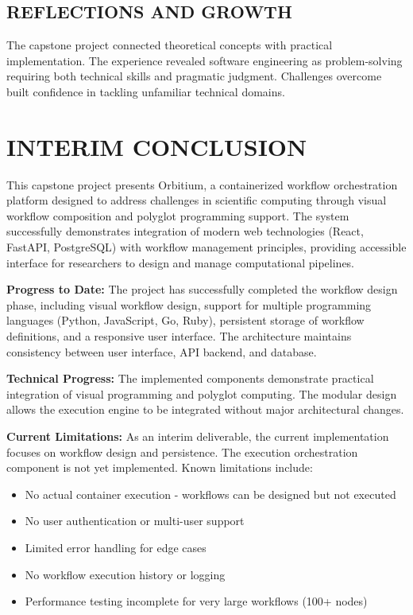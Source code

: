 \documentclass[12pt]{article}
\begin{document}
\subsection{REFLECTIONS AND GROWTH}

\hspace{\parindent}The capstone project connected theoretical concepts with practical implementation. The experience revealed software engineering as problem-solving requiring both technical skills and pragmatic judgment. Challenges overcome built confidence in tackling unfamiliar technical domains.

\newpage
\section{INTERIM CONCLUSION}

\hspace{\parindent}This capstone project presents Orbitium, a containerized workflow orchestration platform designed to address challenges in scientific computing through visual workflow composition and polyglot programming support. The system successfully demonstrates integration of modern web technologies (React, FastAPI, PostgreSQL) with workflow management principles, providing accessible interface for researchers to design and manage computational pipelines.

\hspace{\parindent}\textbf{Progress to Date:} The project has successfully completed the workflow design phase, including visual workflow design, support for multiple programming languages (Python, JavaScript, Go, Ruby), persistent storage of workflow definitions, and a responsive user interface. The architecture maintains consistency between user interface, API backend, and database.

\hspace{\parindent}\textbf{Technical Progress:} The implemented components demonstrate practical integration of visual programming and polyglot computing. The modular design allows the execution engine to be integrated without major architectural changes.

\hspace{\parindent}\textbf{Current Limitations:} As an interim deliverable, the current implementation focuses on workflow design and persistence. The execution orchestration component is not yet implemented. Known limitations include:

\begin{itemize}
    \item No actual container execution - workflows can be designed but not executed
    \item No user authentication or multi-user support
    \item Limited error handling for edge cases
    \item No workflow execution history or logging
    \item Performance testing incomplete for very large workflows (100+ nodes)
\end{itemize}
\end{document}
